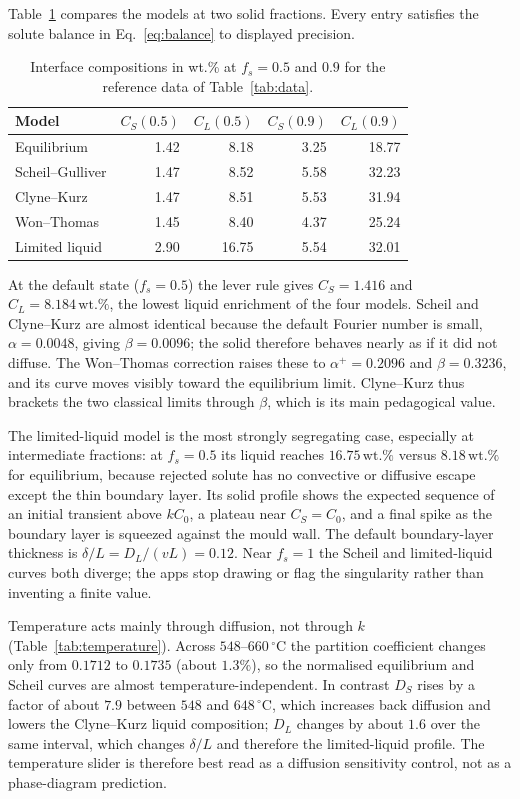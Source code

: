 \documentclass[11pt,a4paper]{article}
\newcommand{\wtpct}{\,\mathrm{wt.\%}}
\begin{document}
Table~\ref{tab:models} compares the models at two solid fractions. Every entry
satisfies the solute balance in Eq.~\eqref{eq:balance} to displayed precision.

\begin{table}[h]
\centering
\small
\begin{tabular}{@{}lrrrr@{}}
\toprule
\textbf{Model} & $C_S(0.5)$ & $C_L(0.5)$ & $C_S(0.9)$ & $C_L(0.9)$\\
\midrule
Equilibrium          & 1.42 & 8.18  & 3.25 & 18.77\\
Scheil--Gulliver     & 1.47 & 8.52  & 5.58 & 32.23\\
Clyne--Kurz          & 1.47 & 8.51  & 5.53 & 31.94\\
Won--Thomas          & 1.45 & 8.40  & 4.37 & 25.24\\
Limited liquid       & 2.90 & 16.75 & 5.54 & 32.01\\
\bottomrule
\end{tabular}
\caption{Interface compositions in wt.\% at $f_s=0.5$ and $0.9$ for the
reference data of Table~\ref{tab:data}.}
\label{tab:models}
\end{table}

At the default state ($f_s=0.5$) the lever rule gives $C_S=1.416$ and
$C_L=8.184\wtpct$, the lowest liquid enrichment of the four models. Scheil and
Clyne--Kurz are almost identical because the default Fourier number is small,
$\alpha=0.0048$, giving $\beta=0.0096$; the solid therefore behaves nearly as
if it did not diffuse. The Won--Thomas correction raises these to
$\alpha^{+}=0.2096$ and $\beta=0.3236$, and its curve moves visibly toward the
equilibrium limit. Clyne--Kurz thus brackets the two classical limits through
$\beta$, which is its main pedagogical value.

The limited-liquid model is the most strongly segregating case, especially at
intermediate fractions: at $f_s=0.5$ its liquid reaches $16.75\wtpct$ versus
$8.18\wtpct$ for equilibrium, because rejected solute has no convective or
diffusive escape except the thin boundary layer. Its solid profile shows the
expected sequence of an initial transient above $kC_0$, a plateau near
$C_S=C_0$, and a final spike as the boundary layer is squeezed against the
mould wall. The default boundary-layer thickness is
$\delta/L=D_L/(vL)=0.12$. Near $f_s=1$ the Scheil and limited-liquid curves
both diverge; the apps stop drawing or flag the singularity rather than
inventing a finite value.

Temperature acts mainly through diffusion, not through $k$
(Table~\ref{tab:temperature}). Across $548$--$660\,^\circ$C the partition
coefficient changes only from $0.1712$ to $0.1735$ (about $1.3\%$), so the
normalised equilibrium and Scheil curves are almost temperature-independent.
In contrast $D_S$ rises by a factor of about $7.9$ between $548$ and
$648\,^\circ$C, which increases back diffusion and lowers the Clyne--Kurz
liquid composition; $D_L$ changes by about $1.6$ over the same interval, which
changes $\delta/L$ and therefore the limited-liquid profile. The temperature
slider is therefore best read as a diffusion sensitivity control, not as a
phase-diagram prediction.
\end{document}

